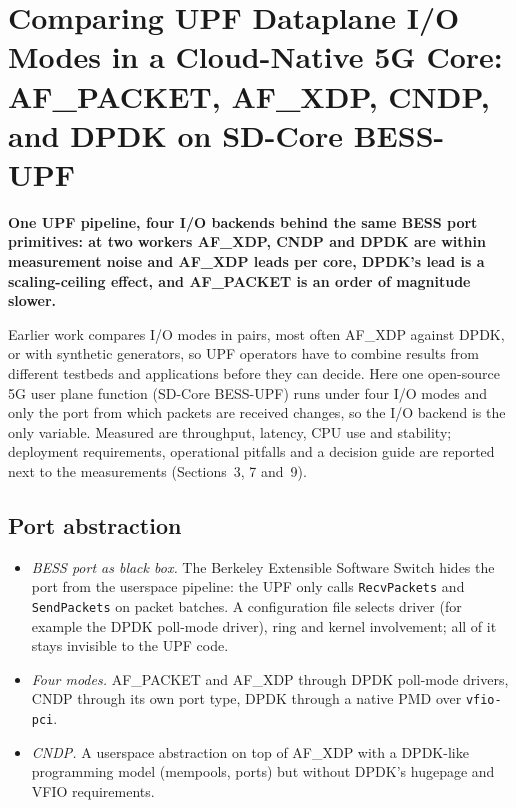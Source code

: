\documentclass[11pt,a4paper]{article}
\newcommand{\finding}[1]{\textbf{#1}\par\smallskip}
\begin{document}
\section*{\large\normalfont Comparing UPF Dataplane I/O Modes in a Cloud-Native 5G Core: AF\_PACKET, AF\_XDP, CNDP, and DPDK on SD-Core BESS-UPF~\cite{valia2026}}
\finding{One UPF pipeline, four I/O backends behind the same BESS port primitives: at two workers AF\_XDP, CNDP and DPDK are within measurement noise and AF\_XDP leads per core, DPDK's lead is a scaling-ceiling effect, and AF\_PACKET is an order of magnitude slower.}
Earlier work compares I/O modes in pairs, most often AF\_XDP against DPDK, or with synthetic generators, so UPF operators have to combine results from different testbeds and applications before they can decide.
Here one open-source 5G user plane function (SD-Core BESS-UPF) runs under four I/O modes and only the port from which packets are received changes, so the I/O backend is the only variable.
Measured are throughput, latency, CPU use and stability; deployment requirements, operational pitfalls and a decision guide are reported next to the measurements (Sections~3, 7 and~9).

\subsection*{\normalsize\normalfont Port abstraction}
\begin{itemize}
\setlength{\itemsep}{2pt}
\item \emph{BESS port as black box.}
The Berkeley Extensible Software Switch hides the port from the userspace pipeline: the UPF only calls \texttt{RecvPackets} and \texttt{SendPackets} on packet batches.
A configuration file selects driver (for example the DPDK poll-mode driver), ring and kernel involvement; all of it stays invisible to the UPF code.
\item \emph{Four modes.}
AF\_PACKET and AF\_XDP through DPDK poll-mode drivers, CNDP through its own port type, DPDK through a native PMD over \texttt{vfio-pci}.
\item \emph{CNDP.}
A userspace abstraction on top of AF\_XDP with a DPDK-like programming model (mempools, ports) but without DPDK's hugepage and VFIO requirements.
\end{itemize}
\end{document}
